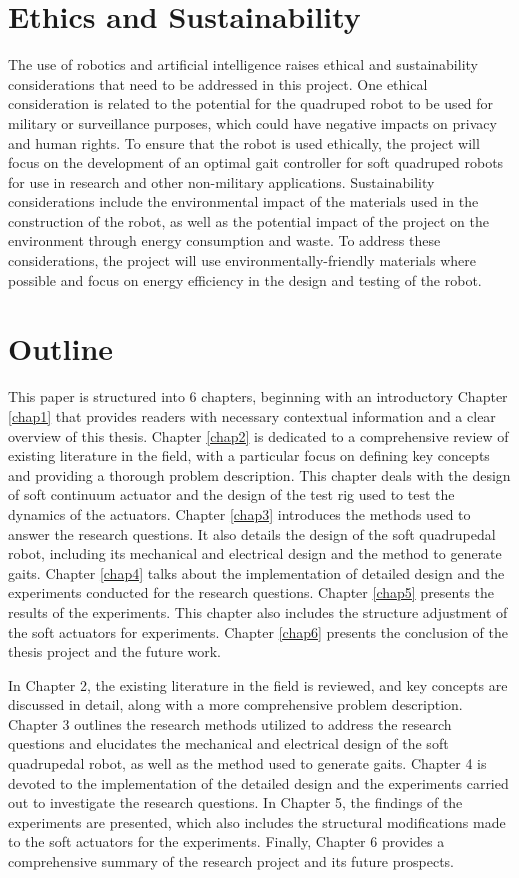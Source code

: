 \section{Ethics and Sustainability}
The use of robotics and artificial intelligence raises ethical and sustainability considerations that need to be addressed in this project. One ethical consideration is related to the potential for the quadruped robot to be used for military or surveillance purposes, which could have negative impacts on privacy and human rights. To ensure that the robot is used ethically, the project will focus on the development of an optimal gait controller for soft quadruped robots for use in research and other non-military applications. Sustainability considerations include the environmental impact of the materials used in the construction of the robot, as well as the potential impact of the project on the environment through energy consumption and waste. To address these considerations, the project will use environmentally-friendly materials where possible and focus on energy efficiency in the design and testing of the robot.

\section{Outline}
This paper is structured into 6 chapters, beginning with an introductory Chapter \ref{chap1} that provides readers with necessary contextual information and a clear overview of this thesis. Chapter \ref{chap2} is dedicated to a comprehensive review of existing literature in the field, with a particular focus on defining key concepts and providing a thorough problem description. This chapter deals with the design of soft continuum actuator and the design of the test rig used to test the dynamics of the actuators. Chapter \ref{chap3} introduces the methods used to answer the research questions. It also details the design of the soft quadrupedal robot, including its mechanical and electrical design and the method to generate gaits. Chapter \ref{chap4} talks about the implementation of detailed design and the experiments conducted for the research questions. Chapter \ref{chap5} presents the results of the experiments. This chapter also includes the structure adjustment of the soft actuators for experiments. Chapter \ref{chap6} presents the conclusion of the thesis project and the future work. 

In Chapter 2, the existing literature in the field is reviewed, and key concepts are discussed in detail, along with a more comprehensive problem description. Chapter 3 outlines the research methods utilized to address the research questions and elucidates the mechanical and electrical design of the soft quadrupedal robot, as well as the method used to generate gaits. Chapter 4 is devoted to the implementation of the detailed design and the experiments carried out to investigate the research questions. In Chapter 5, the findings of the experiments are presented, which also includes the structural modifications made to the soft actuators for the experiments. Finally, Chapter 6 provides a comprehensive summary of the research project and its future prospects.

